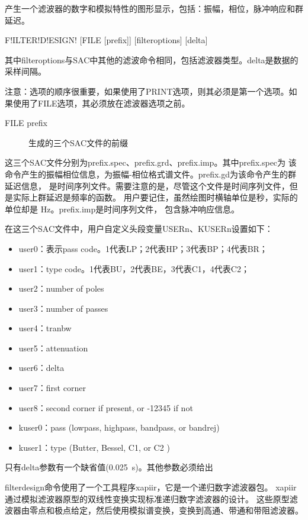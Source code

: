 \label{cmd:filterdesign}

产生一个滤波器的数字和模拟特性的图形显示，包括：振幅，相位，脉冲响应和群延迟。

\begin{SACSTX}
F!ILTER!D!ESIGN! [FILE [prefix]] [filteroptions] [delta]
\end{SACSTX}
其中filteroptions与SAC中其他的滤波命令相同，包括滤波器类型。delta是数据的采样间隔。

注意：选项的顺序很重要，如果使用了PRINT选项，则其必须是第一个选项。如果使用了FILE选项，其必须放在滤波器选项之前。

\begin{description}
\item [FILE prefix] 生成的三个SAC文件的前缀
\end{description}

这三个SAC文件分别为prefix.spec、prefix.grd、prefix.imp。其中prefix.spec为
该命令产生的振幅相位信息，为振幅-相位格式谱文件。prefix.gd为该命令产生的群延迟信息，
是时间序列文件。需要注意的是，尽管这个文件是时间序列文件，但是实际上群延迟是频率的函数。
用户要记住，虽然绘图时横轴单位是秒，实际的单位却是 \si{\Hz}。prefix.imp是时间序列文件，
包含脉冲响应信息。

在这三个SAC文件中，用户自定义头段变量USERn、KUSERn设置如下：
\begin{itemize}
\item user0：表示pass code。1代表LP；2代表HP；3代表BP；4代表BR；
\item user1：type code。1代表BU，2代表BE，3代表C1，4代表C2；
\item user2：number of poles
\item user3：number of passes
\item user4：tranbw
\item user5：attenuation
\item user6：delta
\item user7：first corner
\item user8：second corner if present, or -12345 if not
\item kuser0：pass (lowpass, highpass, bandpass, or bandrej)
\item kuser1：type (Butter, Bessel, C1, or C2 )
\end{itemize}

只有delta参数有一个缺省值(\SI{0.025}{\s})。其他参数必须给出

filterdesign命令使用了一个工具程序xapiir，它是一个递归数字滤波器包。
xapiir通过模拟滤波器原型的双线性变换实现标准递归数字滤波器的设计。
这些原型滤波器由零点和极点给定，然后使用模拟谱变换，变换到高通、带通和带阻滤波器。


